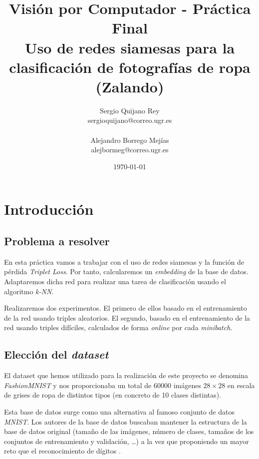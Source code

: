 \documentclass[11pt]{article}
\title{
    {Visión por Computador - Práctica Final} \\
    {Uso de redes siamesas para la clasificación de fotografías de ropa (Zalando)}
}
\author{
    {Sergio Quijano Rey}\\
    {sergioquijano@correo.ugr.es} \\
    {}\\
    {Alejandro Borrego Mejías} \\
    {alejbormeg@correo.ugr.es}\\
}
\date{\today}
\begin{document}
\maketitle
\pagebreak

\tableofcontents


\listoffigures

\listoftables

{}

\pagebreak

\section{Introducción}

\subsection{Problema a resolver}

En esta práctica vamos a trabajar con el uso de redes siamesas y la función de pérdida \emph{Triplet Loss}. Por tanto, calcularemos un \emph{embedding} de la base de datos. Adaptaremos dicha red para realizar una tarea de clasificación usando el algoritmo \emph{k-NN}.

Realizaremos dos experimentos. El primero de ellos basado en el entrenamiento de la red usando triples aleatorios. El segundo, basado en el entrenamiento de la red usando triples difíciles, calculados de forma \emph{online} por cada \emph{minibatch}.

\subsection{Elección del \emph{dataset}}

El dataset que hemos utilizado para la realización de este proyecto se denomina \emph{FashionMNIST} \cite{zalando_dataset:online} y nos proporcionaba un total de 60000 imágenes $28 \times 28$ en escala de grises de ropa de distintos tipos (en concreto de 10 clases distintas). 

Esta base de datos surge como una alternativa al famoso conjunto de datos \emph{MNIST}. Los autores de la base de datos buscaban mantener la estructura de la base de datos original (tamaño de las imágenes, número de clases, tamaños de los conjuntos de entrenamiento y validación, \ldots) a la vez que proponiendo un mayor reto que el reconocimiento de dígitos \cite{database_why:online}.
\end{document}
